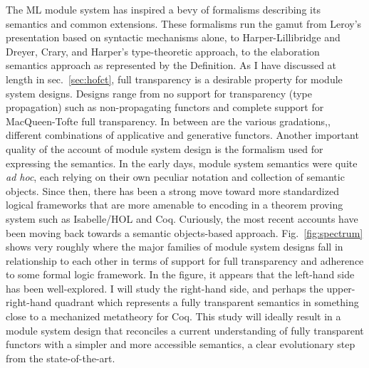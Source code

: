 \documentclass[12pt]{article}
\begin{document}
The ML module system has inspired a bevy of formalisms describing its semantics and common extensions. These formalisms run the gamut from Leroy's presentation based on syntactic mechanisms alone, to Harper-Lillibridge \cite{lillibridge94} and Dreyer, Crary, and Harper's \cite{dhc03} type-theoretic approach, to the elaboration semantics approach as represented by the Definition\cite{mthm97}. As I have discussed at length in sec.~\ref{sec:hofct}, full transparency is a desirable property for module system designs. Designs range from no support for transparency (type propagation) such as non-propagating functors and complete support for MacQueen-Tofte full transparency. In between are the various gradations,\ie, different combinations of applicative and generative functors.  Another important quality of the account of module system design is the formalism used for expressing the semantics. In the early days, module system semantics were quite {\it ad hoc}, each relying on their own peculiar notation and collection of semantic objects\cite{wirth:module,cacm:mesa,tofte92}. Since then, there has been a strong move toward more standardized logical frameworks that are more amenable to encoding in a theorem proving system such as Isabelle/HOL and Coq\cite{lillibridge94,dhc03}. Curiously, the most recent accounts have been moving back towards a semantic objects-based approach\cite{dreyer07,mixml}. Fig.~\ref{fig:spectrum} shows very roughly where the major families of module system designs fall in relationship to each other in terms of support for full transparency and adherence to some formal logic framework. In the figure, it appears that the left-hand side has been well-explored. I will study the right-hand side, and perhaps the upper-right-hand quadrant which represents a fully transparent semantics in something close to a mechanized metatheory for Coq. This study will ideally result in a module system design that reconciles a current understanding of fully transparent functors with a simpler and more accessible semantics, a clear evolutionary step from the state-of-the-art. 
\end{document}
